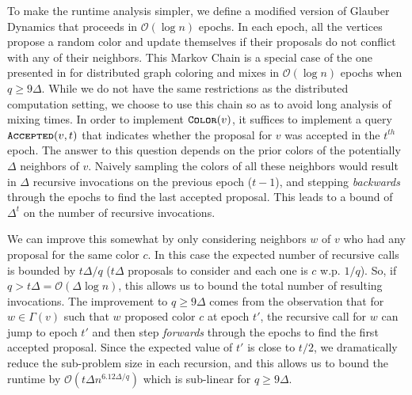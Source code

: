 To make the runtime analysis simpler, we define a modified version of Glauber Dynamics that proceeds in $\mathcal O(\log n)$ epochs.
In each epoch, all the vertices propose a random color and update themselves if their proposals do not conflict with any of their neighbors.
This Markov Chain is a special case of the one presented in \cite{mohsen} for distributed graph coloring
and mixes in $\mathcal O(\log n)$ epochs when $q\ge 9\Delta$.
While we do not have the same restrictions as the distributed computation setting,
we choose to use this chain so as to avoid long analysis of mixing times.
In order to implement $\texttt{\textsc{Color}}(v)$, it suffices to implement a query $\texttt{\textsc{Accepted}}(v,t)$
that indicates whether the proposal for $v$ was accepted in the $t^{th}$ epoch.
The answer to this question depends on the prior colors of the potentially $\Delta$ neighbors of $v$.
Naively sampling the colors of all these neighbors would result in $\Delta$ recursive invocations on the previous epoch ($t-1$),
and stepping \emph{backwards} through the epochs to find the last accepted proposal.
This leads to a bound of $\Delta^t$ on the number of recursive invocations.

We can improve this somewhat by only considering neighbors $w$ of $v$ who had any proposal for the same color $c$.
In this case the expected number of recursive calls is bounded by $t\Delta/q$ ($t\Delta$ proposals to consider and each one is $c$ w.p. $1/q$).
So, if $q > t\Delta = \mathcal O(\Delta\log n)$, this allows us to bound the total number of resulting invocations.
The improvement to $q\ge 9\Delta$ comes from the observation that for $w\in\Gamma(v)$ such that $w$ proposed color $c$ at epoch $t'$,
the recursive call for $w$ can jump to epoch $t'$ and then step \emph{forwards} through the epochs to find the first accepted proposal.
Since the expected value of $t'$ is close to $t/2$, we dramatically reduce the sub-problem size in each recursion,
and this allows us to bound the runtime by $\mathcal O\left(t\Delta n^{6.12\Delta/q}\right)$ which is sub-linear for $q \ge 9\Delta$.
